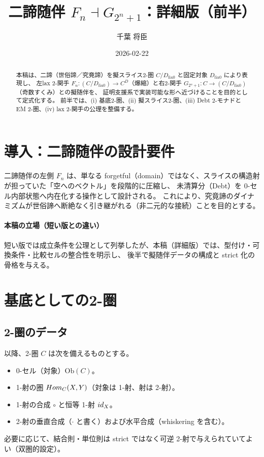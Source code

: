 \documentclass[a4paper,11pt]{article}
\title{二諦随伴 \texorpdfstring{$F_n \dashv G_{2^n+1}$}{Fn dashv G(2^n+1)}：詳細版（前半）}
\author{千葉 将臣}
\date{2026-02-22}
\begin{document}
\maketitle

\begin{abstract}
本稿は、二諦（世俗諦／究竟諦）を擬スライス2-圏 $C/D_{\mathrm{fix}0}$ と固定対象 $D_{\mathrm{fix}0}$ により表現し、
左lax 2-関手 $F_n:(C/D_{\mathrm{fix}0})\to C^D$（爆縮）と右2-関手 $G_{2^n+1}:C\to(C/D_{\mathrm{fix}0})$（奇数すくみ）との擬随伴を、
証明支援系で実装可能な形へ近づけることを目的として定式化する。
前半では、(i) 基底2-圏、(ii) 擬スライス2-圏、(iii) Debt 2-モナドと EM 2-圏、(iv) lax 2-関手の公理を整備する。
\end{abstract}

\tableofcontents

\section{導入：二諦随伴の設計要件}
二諦随伴の左側 $F_n$ は、単なる forgetful（domain）ではなく、スライスの構造射が担っていた「空へのベクトル」を段階的に圧縮し、
未清算分（Debt）を 0-セル内部状態へ内在化する操作として設計される。
これにより、究竟諦のダイナミズムが世俗諦へ断絶なく引き継がれる（非二元的な接続）ことを目的とする。

\paragraph{本稿の立場（短い版との違い）}
短い版では成立条件を公理として列挙したが、本稿（詳細版）では、型付け・可換条件・比較セルの整合性を明示し、
後半で擬随伴データの構成と strict 化の骨格を与える。

\section{基底としての2-圏}
\subsection{2-圏のデータ}
\begin{definition}[2-圏（記法）]
以降、2-圏 $C$ は次を備えるものとする。
\begin{itemize}
  \item 0-セル（対象）$\mathrm{Ob}(C)$。
  \item 1-射の圏 $Hom_C(X,Y)$（対象は 1-射、射は 2-射）。
  \item 1-射の合成 $\circ$ と恒等 1-射 $id_X$。
  \item 2-射の垂直合成（$\cdot$ と書く）および水平合成（whiskering を含む）。
\end{itemize}
必要に応じて、結合則・単位則は strict ではなく可逆 2-射で与えられていてよい（双圏的設定）。
\end{definition}
\end{document}
